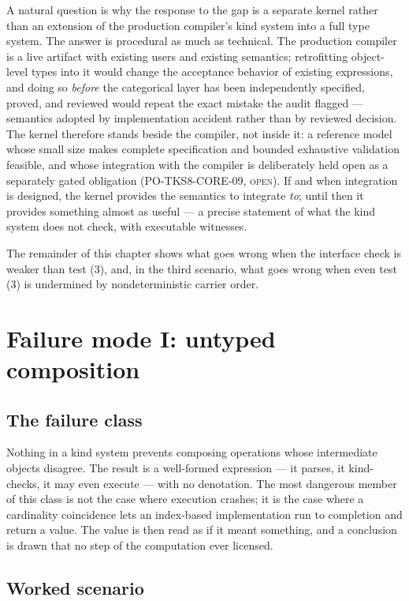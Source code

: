 A natural question is why the response to the gap is a separate kernel
rather than an extension of the production compiler's kind system into a
full type system. The answer is procedural as much as technical. The
production compiler is a live artifact with existing users and existing
semantics; retrofitting object-level types into it would change the
acceptance behavior of existing expressions, and doing so \emph{before}
the categorical layer has been independently specified, proved, and
reviewed would repeat the exact mistake the audit flagged --- semantics
adopted by implementation accident rather than by reviewed decision. The
kernel therefore stands beside the compiler, not inside it: a reference
model whose small size makes complete specification and bounded
exhaustive validation feasible, and whose integration with the compiler
is deliberately held open as a separately gated obligation
(PO-TKS8-CORE-09, \textsc{open}). If and when integration is designed,
the kernel provides the semantics to integrate \emph{to}; until then it
provides something almost as useful --- a precise statement of what the
kind system does not check, with executable witnesses.

The remainder of this chapter shows what goes wrong when the interface check
is weaker than test (3), and, in the third scenario, what goes wrong when even
test (3) is undermined by nondeterministic carrier order.

\section{Failure mode I: untyped composition}\label{ch01:sec:untyped}

\subsection{The failure class}

Nothing in a kind system prevents composing operations whose intermediate
objects disagree. The result is a well-formed expression --- it parses, it
kind-checks, it may even execute --- with no denotation. The most dangerous
member of this class is not the case where execution crashes; it is the case
where a cardinality coincidence lets an index-based implementation run to
completion and return a value. The value is then read as if it meant
something, and a conclusion is drawn that no step of the computation ever
licensed.

\subsection{Worked scenario}\label{ch01:sec:untyped-scenario}


